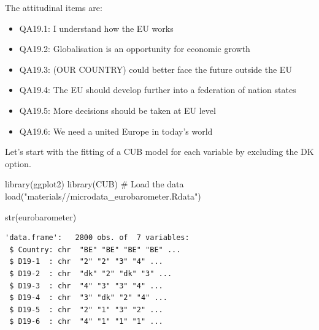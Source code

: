 \documentclass[
  letterpaper,
  DIV=11,
  numbers=noendperiod]{scrartcl}
\newenvironment{Shaded}{\begin{snugshade}}{\end{snugshade}}
\newcommand{\CommentTok}[1]{\textcolor[rgb]{0.37,0.37,0.37}{#1}}
\newcommand{\FunctionTok}[1]{\textcolor[rgb]{0.28,0.35,0.67}{#1}}
\newcommand{\NormalTok}[1]{\textcolor[rgb]{0.00,0.23,0.31}{#1}}
\newcommand{\StringTok}[1]{\textcolor[rgb]{0.13,0.47,0.30}{#1}}
\begin{document}
The attitudinal items are:

\begin{itemize}
\item
  QA19.1: I understand how the EU works
\item
  QA19.2: Globalisation is an opportunity for economic growth
\item
  QA19.3: (OUR COUNTRY) could better face the future outside the EU
\item
  QA19.4: The EU should develop further into a federation of nation
  states
\item
  QA19.5: More decisions should be taken at EU level
\item
  QA19.6: We need a united Europe in today's world
\end{itemize}

Let's start with the fitting of a CUB model for each variable by
excluding the DK option.

\begin{Shaded}
\begin{Highlighting}[]
\FunctionTok{library}\NormalTok{(ggplot2)}
\FunctionTok{library}\NormalTok{(CUB)}
\CommentTok{\# Load the data}
\FunctionTok{load}\NormalTok{(}\StringTok{"materials//microdata\_eurobarometer.Rdata"}\NormalTok{)}
\end{Highlighting}
\end{Shaded}

\begin{Shaded}
\begin{Highlighting}[]
\FunctionTok{str}\NormalTok{(eurobarometer)}
\end{Highlighting}
\end{Shaded}

\begin{verbatim}
'data.frame':   2800 obs. of  7 variables:
 $ Country: chr  "BE" "BE" "BE" "BE" ...
 $ D19-1  : chr  "2" "2" "3" "4" ...
 $ D19-2  : chr  "dk" "2" "dk" "3" ...
 $ D19-3  : chr  "4" "3" "3" "4" ...
 $ D19-4  : chr  "3" "dk" "2" "4" ...
 $ D19-5  : chr  "2" "1" "3" "2" ...
 $ D19-6  : chr  "4" "1" "1" "1" ...
\end{verbatim}
\end{document}
